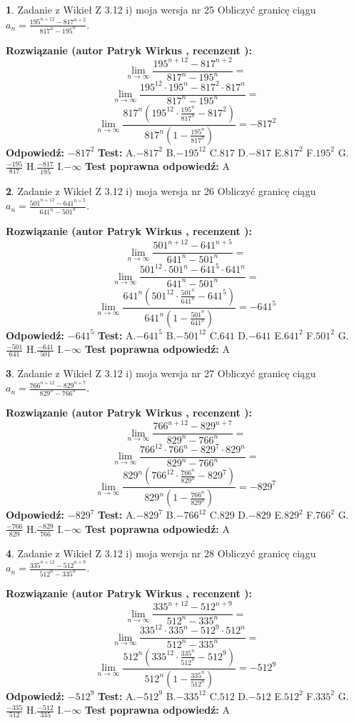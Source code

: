 \documentclass[12pt, a4paper]{article}
\theoremstyle{definition} %
\newtheorem{zad}{}
\newcommand{\zadStart}[1]{\begin{zad}#1\newline}
\newcommand{\zadStop}{\end{zad}}
\newcommand{\rozwStart}[2]{\noindent \textbf{Rozwiązanie (autor #1 , recenzent #2): }\newline}
\newcommand{\rozwStop}{\newline}
\newcommand{\odpStart}{\noindent \textbf{Odpowiedź:}\newline}
\newcommand{\odpStop}{\newline}
\newcommand{\testStart}{\noindent \textbf{Test:}\newline}
\newcommand{\testStop}{\newline}
\newcommand{\kluczStart}{\noindent \textbf{Test poprawna odpowiedź:}\newline}
\newcommand{\kluczStop}{\newline}
\begin{document}
\zadStart{Zadanie z Wikieł Z 3.12 i) moja wersja nr 25}
Obliczyć granicę ciągu $a_{n}=\frac{195^{n+12} - 817^{n+2}}{817^{n}-195^{n}}$.
\zadStop
\rozwStart{Patryk Wirkus}{}
$$\lim\limits_{n\to\infty}\frac{195^{n+12} - 817^{n+2}}{817^{n}-195^{n}}=$$
$$\lim\limits_{n\to\infty}\frac{195^{12} \cdot 195^{n} - 817^{2} \cdot 817^{n}}{817^{n}-195^{n}}=$$
$$\lim\limits_{n\to\infty}\frac{817^{n}(195^{12} \cdot \frac{195^{n}}{817^{n}} - 817^{2})}{817^{n}(1-\frac{195^{n}}{817^{n}})} = -817^{2}$$
\rozwStop
\odpStart
$-817^{2}$
\odpStop
\testStart
A.$-817^{2}$
B.$-195^{12}$
C.$817$
D.$-817$
E.$817^{2}$
F.$195^{2}$
G.$\frac{-195}{817}$
H.$\frac{-817}{195}$
I.$-\infty$
\testStop
\kluczStart
A
\kluczStop



\zadStart{Zadanie z Wikieł Z 3.12 i) moja wersja nr 26}
Obliczyć granicę ciągu $a_{n}=\frac{501^{n+12} - 641^{n+5}}{641^{n}-501^{n}}$.
\zadStop
\rozwStart{Patryk Wirkus}{}
$$\lim\limits_{n\to\infty}\frac{501^{n+12} - 641^{n+5}}{641^{n}-501^{n}}=$$
$$\lim\limits_{n\to\infty}\frac{501^{12} \cdot 501^{n} - 641^{5} \cdot 641^{n}}{641^{n}-501^{n}}=$$
$$\lim\limits_{n\to\infty}\frac{641^{n}(501^{12} \cdot \frac{501^{n}}{641^{n}} - 641^{5})}{641^{n}(1-\frac{501^{n}}{641^{n}})} = -641^{5}$$
\rozwStop
\odpStart
$-641^{5}$
\odpStop
\testStart
A.$-641^{5}$
B.$-501^{12}$
C.$641$
D.$-641$
E.$641^{2}$
F.$501^{2}$
G.$\frac{-501}{641}$
H.$\frac{-641}{501}$
I.$-\infty$
\testStop
\kluczStart
A
\kluczStop



\zadStart{Zadanie z Wikieł Z 3.12 i) moja wersja nr 27}
Obliczyć granicę ciągu $a_{n}=\frac{766^{n+12} - 829^{n+7}}{829^{n}-766^{n}}$.
\zadStop
\rozwStart{Patryk Wirkus}{}
$$\lim\limits_{n\to\infty}\frac{766^{n+12} - 829^{n+7}}{829^{n}-766^{n}}=$$
$$\lim\limits_{n\to\infty}\frac{766^{12} \cdot 766^{n} - 829^{7} \cdot 829^{n}}{829^{n}-766^{n}}=$$
$$\lim\limits_{n\to\infty}\frac{829^{n}(766^{12} \cdot \frac{766^{n}}{829^{n}} - 829^{7})}{829^{n}(1-\frac{766^{n}}{829^{n}})} = -829^{7}$$
\rozwStop
\odpStart
$-829^{7}$
\odpStop
\testStart
A.$-829^{7}$
B.$-766^{12}$
C.$829$
D.$-829$
E.$829^{2}$
F.$766^{2}$
G.$\frac{-766}{829}$
H.$\frac{-829}{766}$
I.$-\infty$
\testStop
\kluczStart
A
\kluczStop



\zadStart{Zadanie z Wikieł Z 3.12 i) moja wersja nr 28}
Obliczyć granicę ciągu $a_{n}=\frac{335^{n+12} - 512^{n+9}}{512^{n}-335^{n}}$.
\zadStop
\rozwStart{Patryk Wirkus}{}
$$\lim\limits_{n\to\infty}\frac{335^{n+12} - 512^{n+9}}{512^{n}-335^{n}}=$$
$$\lim\limits_{n\to\infty}\frac{335^{12} \cdot 335^{n} - 512^{9} \cdot 512^{n}}{512^{n}-335^{n}}=$$
$$\lim\limits_{n\to\infty}\frac{512^{n}(335^{12} \cdot \frac{335^{n}}{512^{n}} - 512^{9})}{512^{n}(1-\frac{335^{n}}{512^{n}})} = -512^{9}$$
\rozwStop
\odpStart
$-512^{9}$
\odpStop
\testStart
A.$-512^{9}$
B.$-335^{12}$
C.$512$
D.$-512$
E.$512^{2}$
F.$335^{2}$
G.$\frac{-335}{512}$
H.$\frac{-512}{335}$
I.$-\infty$
\testStop
\kluczStart
A
\kluczStop
\end{document}
